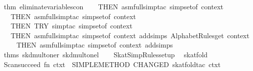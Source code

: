 \begin{isabellebody}
\isaantiq
thm\ eliminate{}variables{}con{}%
\endisaantiq
{}\ {}{}\isanewline
\ \ THEN\ asm{}full{}simp{}tac\ {}simpset{}of\ context{}\ {}\isanewline
\ \ THEN\ asm{}full{}simp{}tac\ {}simpset{}of\ context{}\ {}\isanewline
\ \ THEN\ TRY\ {}simp{}tac\ {}simpset{}of\ context{}\ {}{}\isanewline
\ \ THEN\ asm{}full{}simp{}tac\ {}simpset{}of\ context\ addsimps\ AlphabetRules{}get\ context{}\ {}\isanewline
\ \ THEN\ asm{}full{}simp{}tac\ {}simpset{}of\ context\ addsimps\ %
\isaantiq
thms\ skd{}mult{}oner\ skd{}mult{}onel{}%
\endisaantiq
{}\ {}{}\isanewline
\isanewline
{}\isanewline
\isanewline
{}\isamarkupfalse%
\ {}\ SkatSimpRules{}setup\ {}\isanewline
\isanewline
{}\isamarkupfalse%
\ skat{}fold\ {}\ {}\isanewline
Scan{}succeed\ {}fn\ ctxt\ {}{}\ SIMPLE{}METHOD\ {}CHANGED\ {}skat{}fold{}tac\ ctxt\ {}{}{}{}\isanewline

\end{isabellebody}
